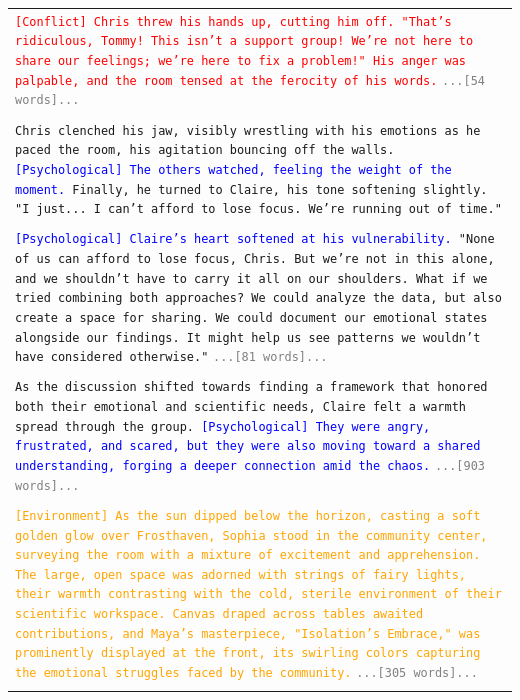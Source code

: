 \documentclass[letterpaper]{article} %
\begin{document}
\begin{small}
\begin{longtable}{p{\textwidth}}
    \texttt{\textcolor{red}{[Conflict] Chris threw his hands up, cutting him off. "That's ridiculous, Tommy! This isn't a support group! We're not here to share our feelings; we're here to fix a problem!" His anger was palpable, and the room tensed at the ferocity of his words.}}
    \texttt{\textcolor{gray}{...[54 words]...}} \\\\

    \texttt{Chris clenched his jaw, visibly wrestling with his emotions as he paced the room, his agitation bouncing off the walls. \textcolor{blue}{[Psychological] The others watched, feeling the weight of the moment.} Finally, he turned to Claire, his tone softening slightly. "I just... I can't afford to lose focus. We're running out of time."} \\\\

    \texttt{\textcolor{blue}{[Psychological] Claire's heart softened at his vulnerability.} "None of us can afford to lose focus, Chris. But we're not in this alone, and we shouldn't have to carry it all on our shoulders. What if we tried combining both approaches? We could analyze the data, but also create a space for sharing. We could document our emotional states alongside our findings. It might help us see patterns we wouldn't have considered otherwise."}
    \texttt{\textcolor{gray}{...[81 words]...}} \\\\

    \texttt{As the discussion shifted towards finding a framework that honored both their emotional and scientific needs, Claire felt a warmth spread through the group. \textcolor{blue}{[Psychological] They were angry, frustrated, and scared, but they were also moving toward a shared understanding, forging a deeper connection amid the chaos.}}
    \texttt{\textcolor{gray}{...[903 words]...}} \\\\

    \texttt{\textcolor{orange}{[Environment] As the sun dipped below the horizon, casting a soft golden glow over Frosthaven, Sophia stood in the community center, surveying the room with a mixture of excitement and apprehension. The large, open space was adorned with strings of fairy lights, their warmth contrasting with the cold, sterile environment of their scientific workspace. Canvas draped across tables awaited contributions, and Maya's masterpiece, "Isolation's Embrace," was prominently displayed at the front, its swirling colors capturing the emotional struggles faced by the community.}}
    \texttt{\textcolor{gray}{...[305 words]...}} \\\\


\end{longtable}
\end{small}
\end{document}
